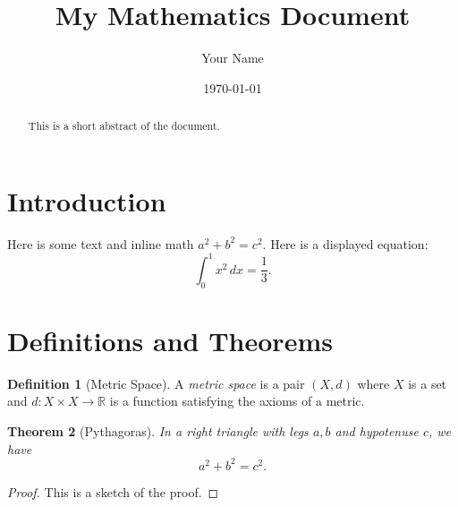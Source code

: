 \documentclass[a4paper,11pt]{article}
\title{My Mathematics Document}
\author{Your Name}
\date{\today}
\newtheorem{theorem}{Theorem}[section]
\theoremstyle{definition}
\newtheorem{definition}[theorem]{Definition}
\theoremstyle{remark}
\begin{document}
\maketitle

\begin{abstract}
This is a short abstract of the document. 
\end{abstract}

\section{Introduction}

Here is some text and inline math $a^2 + b^2 = c^2$.  
Here is a displayed equation:
\begin{equation}
    \int_{0}^{1} x^2 \, dx = \frac{1}{3}.
\end{equation}

\section{Definitions and Theorems}

\begin{definition}[Metric Space]
A \emph{metric space} is a pair $(X,d)$ where $X$ is a set and 
$d : X \times X \to \mathbb{R}$ is a function satisfying the axioms of a metric.
\end{definition}

\begin{theorem}[Pythagoras]
In a right triangle with legs $a,b$ and hypotenuse $c$, we have
\[
    a^2 + b^2 = c^2.
\]
\end{theorem}

\begin{proof}
This is a sketch of the proof.
\end{proof}
\end{document}
